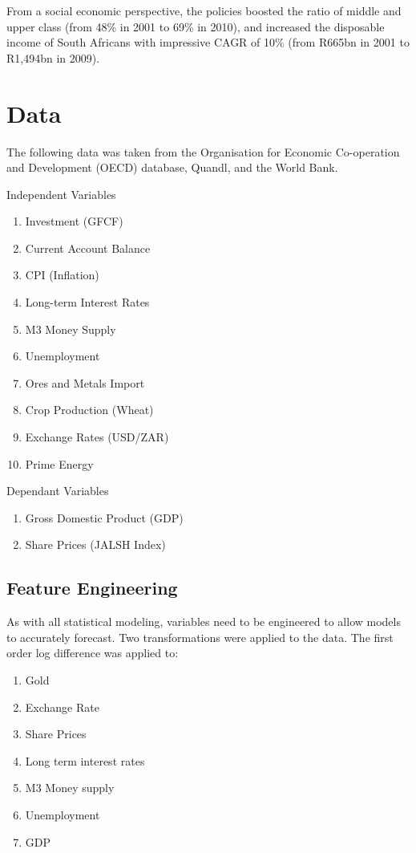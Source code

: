 \documentclass{elsarticle}
\begin{document}
From a social economic perspective, the policies boosted the ratio of middle and upper class (from 48\% in 2001 to 69\% in 2010), and increased the disposable income of South Africans with impressive CAGR of 10\% (from R665bn in 2001 to R1,494bn in 2009).


\section{Data}
The following data was taken from the Organisation for Economic Co-operation and Development (OECD) database, Quandl, and the World Bank. 

Independent Variables
\begin{enumerate}
    \item Investment (GFCF)
    \item Current Account Balance
    \item CPI (Inflation)
    \item Long-term Interest Rates
    \item M3 Money Supply
    \item Unemployment
    \item Ores and Metals Import
    \item Crop Production (Wheat)
    \item Exchange Rates (USD/ZAR)
    \item Prime Energy
\end{enumerate}

Dependant Variables
\begin{enumerate}
    \item Gross Domestic Product (GDP)
    \item Share Prices (JALSH Index)
\end{enumerate}

\subsection{Feature Engineering}
As with all statistical modeling, variables need to be engineered to allow models to accurately forecast. Two transformations were applied to the data. The first order log difference was applied to: 
\begin{enumerate}
    \item Gold
    \item Exchange Rate
    \item Share Prices
    \item Long term interest rates
    \item M3 Money supply
    \item Unemployment
    \item GDP
\end{enumerate}
\end{document}
